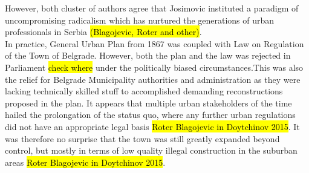 \documentclass[11pt]{report}
\begin{document}
However, both cluster of authors agree that Josimovic instituted a 
paradigm of uncompromising radicalism which has nurtured the generations of urban professionals in Serbia \hl{(Blagojevic, Roter and other)}.
\\
In practice, General Urban Plan from 1867 was coupled with Law on Regulation of the Town of Belgrade. However, both the plan and the law was rejected in Parliament \hl{check where} under the politically biased circumstances.\footnotemark This was also the relief for Belgrade Municipality authorities and administration as they were lacking technically skilled stuff to accomplished demanding reconstructions proposed in the plan. It appears that multiple urban stakeholders of the time hailed the prolongation of the status quo, where any further urban regulations did not have an appropriate legal basis \hl{Roter Blagojevic in Doytchinov 2015}. It was therefore no surprise that the town was still greatly  expanded  beyond  control,  but mostly in terms of  low quality illegal  construction  in the suburban areas \hl{Roter Blagojevic in Doytchinov 2015}.
\end{document}
